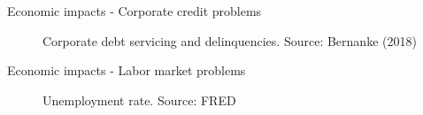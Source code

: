 \begin{frame}{Economic impacts - Corporate credit problems}

\begin{figure}
\begin{center}


\caption{Corporate debt servicing and delinquencies. Source: Bernanke (2018)}

\end{center}
\end{figure}

\end{frame}



\begin{frame}{Economic impacts - Labor market problems}

\begin{figure}
\begin{center}


\caption{Unemployment rate. Source: FRED}

\end{center}
\end{figure}

\end{frame}

